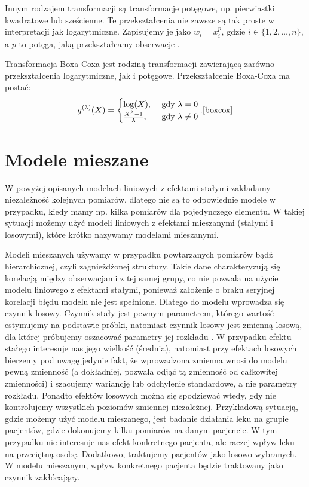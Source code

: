 \documentclass[12pt]{mwbk}
\theoremstyle{plain}
\theoremstyle{definition}
\theoremstyle{remark}
\begin{document}
Innym rodzajem transformacji są transformacje potęgowe, np. pierwiastki kwadratowe lub sześcienne. Te przekształcenia nie zawsze są tak proste w interpretacji jak logarytmiczne. Zapisujemy je jako $w_i=x_i^p$, gdzie $i \in \lbrace{1,2,\ldots,n\rbrace}$, a $p$ to potęga, jaką przekształcamy obserwacje \cite{forecasting}.

Transformacja Boxa-Coxa jest rodziną transformacji zawierającą zarówno przekształcenia logarytmiczne, jak i potęgowe. Przekształcenie Boxa-Coxa ma postać:
$$g^{(\lambda)}(X)=\begin{cases}
\log(X), & \text{ gdy } \lambda=0 \\
\frac{X^{\lambda}-1}{\lambda},&\text{ gdy } \lambda \neq 0
\end{cases}. \cite{boxcox}$$

\section{Modele mieszane} 
W powyżej opisanych modelach liniowych z efektami stałymi zakładamy niezależność kolejnych pomiarów, dlatego nie są to odpowiednie modele w przypadku, kiedy mamy np. kilka pomiarów dla pojedynczego elementu. W takiej sytuacji możemy użyć modeli liniowych z efektami mieszanymi (stałymi i losowymi), które krótko nazywamy modelami mieszanymi.

Modeli mieszanych używamy w przypadku powtarzanych pomiarów bądź hierarchicznej, czyli zagnieżdżonej struktury. Takie dane charakteryzują się korelacją między obserwacjami z tej samej grupy, co nie pozwala na użycie modelu liniowego z efektami stałymi, ponieważ założenie o braku seryjnej korelacji błędu modelu nie jest spełnione. Dlatego do modelu wprowadza się czynnik losowy.  Czynnik stały jest pewnym parametrem, którego wartość estymujemy na podstawie próbki, natomiast czynnik losowy jest zmienną losową, dla której próbujemy oszacować parametry jej rozkładu \cite{faraway}. W przypadku efektu stałego interesuje nas jego wielkość (średnia), natomiast przy efektach losowych bierzemy pod uwagę jedynie fakt, że wprowadzona zmienna wnosi do modelu pewną zmienność (a dokładniej, pozwala odjąć tą zmienność od całkowitej zmienności) i szacujemy wariancję lub odchylenie standardowe, a nie parametry rozkładu. Ponadto efektów losowych można się spodziewać wtedy, gdy nie kontrolujemy wszystkich poziomów zmiennej niezależnej. Przykładową sytuacją, gdzie możemy użyć modelu mieszanego, jest badanie działania leku na grupie pacjentów, gdzie dokonujemy kilku pomiarów na danym pacjencie. W tym przypadku nie interesuje nas efekt konkretnego pacjenta, ale raczej wpływ leku na przeciętną osobę. Dodatkowo, traktujemy pacjentów jako losowo wybranych. W modelu mieszanym, wpływ konkretnego pacjenta będzie traktowany jako czynnik zakłócający.
\end{document}

